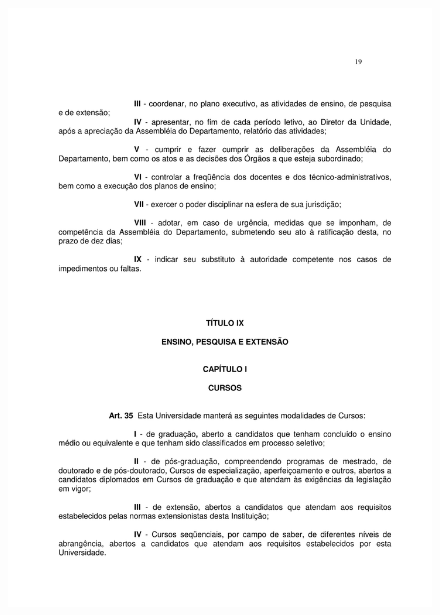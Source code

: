 \begin{figure}[p]
	\centering 
	\includegraphics[scale=0.7]{capitulos/resolucoes/cuni414/cuni414-19.pdf}
\end{figure} \pagebreak

